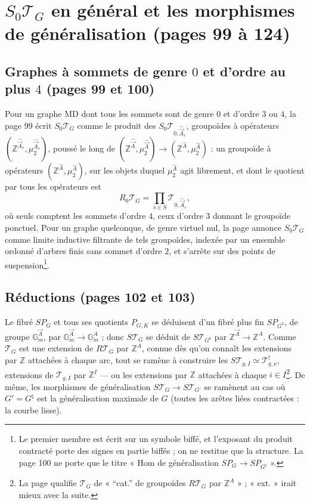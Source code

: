 \documentclass[11pt,a4paper]{article}
\begin{document}
\section*{$S_0\mathcal{T}_G$ en général et les morphismes de généralisation
(pages 99 à 124)}

\subsection*{Graphes à sommets de genre $0$ et d'ordre au plus $4$ (pages 99 et
100)}

Pour un graphe MD dont tous les sommets sont de genre $0$ et d'ordre $3$ ou
$4$, la page 99 écrit $S_0\mathcal{T}_G$ comme le produit des
$S_0\mathcal{T}_{0, \hat{\vec A}_s}$, groupoïdes à opérateurs
$(\mathbb{Z}^{\hat{\vec A}_s}, \mu_2^{\hat{\vec A}_s})$, poussé le long de
$(\mathbb{Z}^{\hat{\vec A}}, \mu_2^{\hat{\vec A}}) \to (\mathbb{Z}^{\hat A},
\mu_2^{\hat A})$ : un groupoïde à opérateurs $(\mathbb{Z}^{\hat A},
\mu_2^{\hat A})$, sur les objets duquel $\mu_2^{\hat A}$ agit librement, et
dont le quotient par tous les opérateurs est
\[
R_0\mathcal{T}_G = \prod_{s \in S} \mathcal{T}_{0, \hat{\vec A}_s},
\]
où seuls comptent les sommets d'ordre $4$, ceux d'ordre $3$ donnant le
groupoïde ponctuel. Pour un graphe quelconque, de genre virtuel nul, la page
annonce $S_0\mathcal{T}_G$ comme limite inductive filtrante de tels groupoïdes,
indexée par un ensemble ordonné d'arbres finis sans sommet d'ordre $2$, et
s'arrête sur des points de suspension\footnote{Le premier membre est écrit sur
un symbole biffé, et l'exposant du produit contracté porte des signes en partie
biffés ; on ne restitue que la structure. La page 100 ne porte que le titre
« Hom de généralisation $SP_G \to SP_{G^\natural}$ ».}.

\subsection*{Réductions (pages 102 et 103)}

Le fibré $SP_G$ et tous ses quotients $P_{G,K}$ se déduisent d'un fibré plus
fin $SP_{G^b}$, de groupe $\mathbb{G}_m^{\vec A}$, par $\mathbb{G}_m^{\vec A}
\to \mathbb{G}_m^{A}$ ; donc $S\mathcal{T}_G$ se déduit de
$S\mathcal{T}_{G^b}$ par $\mathbb{Z}^{\vec A} \to \mathbb{Z}^A$. Comme
$\mathcal{T}_G$ est une extension de $R\mathcal{T}_G$ par $\mathbb{Z}^A$,
connue dès qu'on connaît les extensions par $\mathbb{Z}$ attachées à chaque
arc, tout se ramène à construire les $S\mathcal{T}_{g,I} \simeq
\mathcal{T}^{!}_{g,\nu}$, extensions de $\mathcal{T}_{g,I}$ par $\mathbb{Z}^I$
— ou les extensions par $\mathbb{Z}$ attachées à chaque $i \in I$\footnote{La
page qualifie $\mathcal{T}_G$ de « “cat.” de groupoïdes $R\mathcal{T}_G$ par
$\mathbb{Z}^A$ » ; « ext. » irait mieux avec la suite.}. De même, les
morphismes de généralisation $S\mathcal{T}_G \to S\mathcal{T}_{G'}$ se
ramènent au cas où $G' = G^{\natural}$ est la généralisation maximale de $G$
(toutes les arêtes liées contractées : la courbe lisse).
\end{document}
